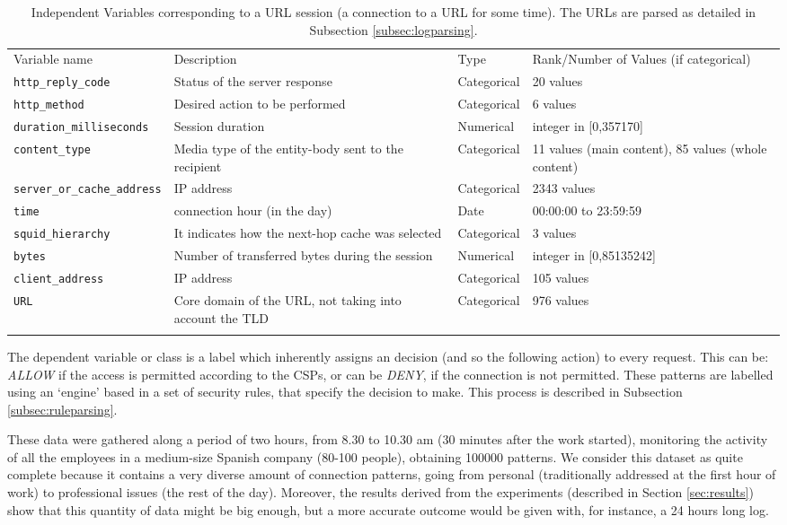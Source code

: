 \documentclass{llncs}
\begin{document}
\begin{table*}[htpb]
\centering
 \caption{\label{tabdata} Independent Variables corresponding to a URL session (a connection to a URL for some time). The URLs are parsed as detailed in Subsection \ref{subsec:logparsing}.}
{\scriptsize
\begin{tabular}{llll}
\hline\noalign{\smallskip}
Variable name & Description & Type & Rank/Number of Values (if categorical)\\
\noalign{\smallskip}\hline\noalign{\smallskip}
\texttt{http\_reply\_code} & Status of the server response & Categorical & 20 values\\
\texttt{http\_method} & Desired action to be performed & Categorical & 6 values\\
\texttt{duration\_milliseconds} & Session duration & Numerical & integer in [0,357170]\\
\texttt{content\_type} & Media type of the entity-body sent to the recipient & Categorical & 11 values (main content), 85 values (whole content)\\
\texttt{server\_or\_cache\_address} & IP address & Categorical & 2343 values\\
\texttt{time} & connection hour (in the day) & Date & 00:00:00 to 23:59:59\\
\texttt{squid\_hierarchy} & It indicates how the next-hop cache was selected & Categorical & 3 values\\
\texttt{bytes} & Number of transferred bytes during the session & Numerical & integer in [0,85135242]\\
\texttt{client\_address} & IP address & Categorical & 105 values\\
\texttt{URL} & Core domain of the URL, not taking into account the TLD & Categorical & 976 values\\
\noalign{\smallskip}\hline
\end{tabular}
}
\end{table*}

The dependent variable or class is a label which inherently assigns an decision (and so the following action) to every request. This can be: \textit{ALLOW} if the access is permitted according to the CSPs, or can be \textit{DENY}, if the connection is not permitted. These patterns are labelled using an `engine' based in a set of security rules, that specify the decision to make. This process is described in Subsection \ref{subsec:ruleparsing}.

These data were gathered along a period of two hours, from 8.30 to
10.30 am (30 minutes after the work started), monitoring the activity
of all the employees in a medium-size Spanish company (80-100 people),
obtaining 100000 patterns. We consider this dataset as quite complete because it contains a very diverse amount of connection patterns, going from personal (traditionally addressed at the first hour of work) to professional issues (the rest of the day).
Moreover, the results derived from the experiments (described in Section \ref{sec:results}) show that this quantity of data might be big enough, but a more accurate outcome would be given with, for instance, a 24 hours long log.
\end{document}
